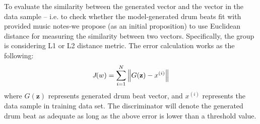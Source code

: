 \newcommand\norm[1]{\left\lVert#1\right\rVert}
\begin{par}
    \par To evaluate the similarity between the generated vector and 
    the vector in the data sample -- i.e. to check whether the model-generated drum beats 
    fit with provided music notes-we propose (as an initial proposition) to use Euclidean distance for 
    measuring the similarity between two vectors. Specifically, the group is considering L1 or L2 
    distance metric. The error calculation works as the following: 
    \begin{equation}
        \emph{J}(w) = \sum_{i=1}^{N} \norm{G(\mathbf{z})-x^{(i)}}
    \end{equation}
    where $G(\mathbf{z})$ represents generated drum beat vector, and $x^{(i)}$
    represents the data sample in training data set. The discriminator will denote the generated drum 
    beat as adequate as long as the above error is lower than a threshold value.

\end{par}
